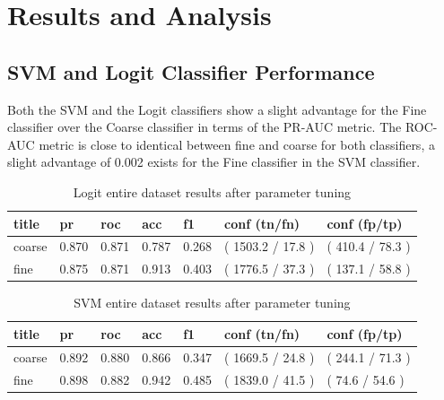 \documentclass[ms]{nuthesis}
\begin{document}
\chapter{Results and Analysis}
\section{SVM and Logit Classifier Performance}
\par Both the SVM and the Logit classifiers show a slight advantage for the Fine
classifier over the Coarse classifier in terms of the PR-AUC metric. The ROC-AUC
metric is close to identical between fine and coarse for both classifiers, a slight
advantage of 0.002 exists for the Fine classifier in the SVM classifier.


\FloatBarrier
\begin{table}[H]
\centering
\caption{Logit entire dataset results after parameter tuning}
\label{tab:LogRegAll-Wt23}
\begin{tabular}{|l||l||l||l||l||l||l|}\toprule
title & pr & roc & acc & f1 & conf (tn/fn) & conf (fp/tp) \\ \midrule
coarse & 0.870 & 0.871 & 0.787 & 0.268 & ( 1503.2 / 17.8 ) & ( 410.4 / 78.3 ) \\
fine & 0.875 & 0.871 & 0.913 & 0.403 & ( 1776.5 / 37.3 ) & ( 137.1 / 58.8 ) \\ \bottomrule
\end{tabular}
\end{table}
\FloatBarrier


\FloatBarrier
\begin{table}[H]
\centering
\caption{SVM entire dataset results after parameter tuning}
\label{tab:SVM-All}
\begin{tabular}{|l||l||l||l||l||l||l|}\toprule
title & pr & roc & acc & f1 & conf (tn/fn) & conf (fp/tp) \\ \midrule
coarse & 0.892 & 0.880 & 0.866 & 0.347 & ( 1669.5 / 24.8 ) & ( 244.1 / 71.3 ) \\
fine & 0.898 & 0.882 & 0.942 & 0.485 & ( 1839.0 / 41.5 ) & ( 74.6 / 54.6 ) \\ \bottomrule
\end{tabular}
\end{table}
\FloatBarrier
\end{document}
